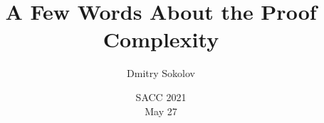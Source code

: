 

\titlegraphic{
    
}


\title[Proof Complexity]{
    A Few Words About the Proof Complexity
}

\author{
    Dmitry Sokolov
}  


\date{SACC 2021\\ May 27}

\newcommand{\SPCR}{\PrSys{S}\text{-}\PrSys{PCR}}
\newcommand{\SSOS}{\PrSys{S}\text{-}\PrSys{SOS}}




    \maketitle

    
    
    
    
    

